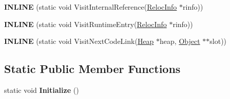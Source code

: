 \begin{DoxyCompactItemize}
\item 
{\bfseries I\+N\+L\+I\+NE} (static void Visit\+Internal\+Reference(\hyperlink{classv8_1_1internal_1_1_reloc_info}{Reloc\+Info} $\ast$rinfo))\hypertarget{classv8_1_1internal_1_1_static_marking_visitor_aa604c8a1644c1270692061265836be26}{}\label{classv8_1_1internal_1_1_static_marking_visitor_aa604c8a1644c1270692061265836be26}

\item 
{\bfseries I\+N\+L\+I\+NE} (static void Visit\+Runtime\+Entry(\hyperlink{classv8_1_1internal_1_1_reloc_info}{Reloc\+Info} $\ast$rinfo))\hypertarget{classv8_1_1internal_1_1_static_marking_visitor_a42875545176a665262d77863bc460696}{}\label{classv8_1_1internal_1_1_static_marking_visitor_a42875545176a665262d77863bc460696}

\item 
{\bfseries I\+N\+L\+I\+NE} (static void Visit\+Next\+Code\+Link(\hyperlink{classv8_1_1internal_1_1_heap}{Heap} $\ast$heap, \hyperlink{classv8_1_1internal_1_1_object}{Object} $\ast$$\ast$slot))\hypertarget{classv8_1_1internal_1_1_static_marking_visitor_a6be9adb4dea3b0d5b29fa445d7f10a4c}{}\label{classv8_1_1internal_1_1_static_marking_visitor_a6be9adb4dea3b0d5b29fa445d7f10a4c}

\end{DoxyCompactItemize}
\subsection*{Static Public Member Functions}
\begin{DoxyCompactItemize}
\item 
static void {\bfseries Initialize} ()\hypertarget{classv8_1_1internal_1_1_static_marking_visitor_a5803b42728ccc54460480efb911242c3}{}\label{classv8_1_1internal_1_1_static_marking_visitor_a5803b42728ccc54460480efb911242c3}

\end{DoxyCompactItemize}
